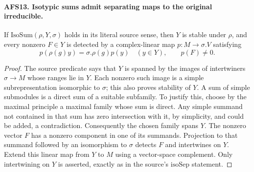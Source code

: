 \paragraph{AFS13. Isotypic sums admit separating maps to the original irreducible.}
\label{claim:AFS13}
If $\mathrm{IsoSum}(\rho,Y,\sigma)$ holds in its literal
source sense, then $Y$ is stable under $\rho$, and every
nonzero $F\in Y$ is detected by a complex-linear map
$p:M\to\sigma.V$ satisfying
\[
 p(\rho(g)y)=\sigma.\rho(g)p(y)\quad(y\in Y),
                                  \qquad p(F)\ne0.
\]
\begin{proof}
The source predicate says that $Y$ is spanned by the images
of intertwiners $\sigma\to M$ whose ranges lie in $Y$.
Each nonzero such image is a simple subrepresentation
isomorphic to $\sigma$; this also proves stability of $Y$.
A sum of simple submodules is a direct sum of a suitable
subfamily.  To justify this, choose by the maximal principle
a maximal family whose sum is direct.  Any simple summand
not contained in that sum has zero intersection with it,
by simplicity, and could be added, a contradiction.
Consequently the chosen family spans $Y$.  The nonzero
vector $F$ has a nonzero component in one of its summands.
Projection to that summand followed by an isomorphism to
$\sigma$ detects $F$ and intertwines on $Y$.  Extend this
linear map from $Y$ to $M$ using a vector-space complement.
Only intertwining on $Y$ is asserted, exactly as in the
source's $\mathrm{isoSep}$ statement.
\end{proof}

